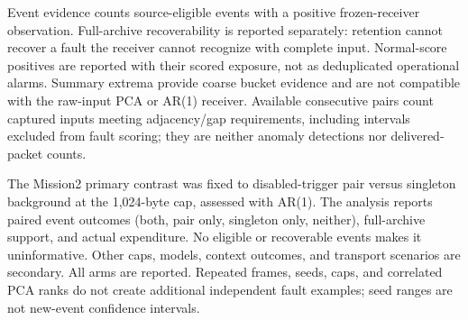 Event evidence counts source-eligible events with a positive frozen-receiver
observation. Full-archive recoverability is reported separately: retention cannot
recover a fault the receiver cannot recognize with complete input. Normal-score
positives are reported with their scored exposure, not as deduplicated operational
alarms. Summary extrema provide coarse bucket evidence and are not compatible with
the raw-input PCA or AR(1) receiver. Available consecutive pairs count captured
inputs meeting adjacency/gap requirements, including intervals excluded from fault
scoring; they are neither anomaly detections nor delivered-packet counts.

The Mission2 primary contrast was fixed to disabled-trigger pair versus singleton
background at the 1,024-byte cap, assessed with AR(1). The analysis reports paired
event outcomes (both, pair only, singleton only, neither), full-archive support,
and actual expenditure. No eligible or recoverable events makes it uninformative.
Other caps, models, context outcomes, and transport scenarios are secondary.
All arms are reported. Repeated frames, seeds, caps, and correlated PCA ranks do
not create additional independent fault examples; seed ranges are not new-event
confidence intervals.
